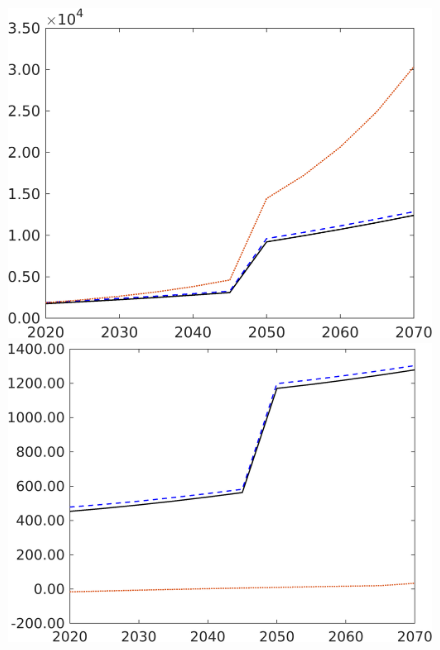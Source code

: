 \begin{figure}[h!!]
\begin{minipage}[]{0.32\textwidth}
	\end{minipage}
	\begin{minipage}[]{0.32\textwidth}
		\includegraphics[width=1\textwidth]{../../codding_model/own_basedOnFried/optimalPol_190722_tidiedUp/figures/all_10Aout22/GFF_PercentageLfDynNT_Target_regime3_spillover0_noskill0_sep1_xgrowth0_etaa0.79_lgd0.png}
	\end{minipage}
	\begin{minipage}[]{0.32\textwidth}
		\includegraphics[width=1\textwidth]{../../codding_model/own_basedOnFried/optimalPol_190722_tidiedUp/figures/all_10Aout22/sgsff_PercentageLfDynNT_Target_regime3_spillover0_noskill0_sep1_xgrowth0_etaa0.79_lgd0.png}

\end{minipage}
\end{figure}
